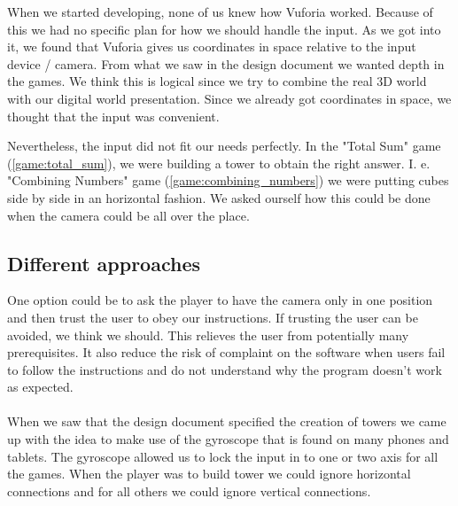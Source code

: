 

When we started developing, none of us knew how Vuforia worked. Because of this
we had no specific plan for how we should handle the input. As we got into it,
we found that Vuforia gives us coordinates in space relative to the input
device / camera. From what we saw in the design document we wanted depth in the
games. We think this is logical since we try to combine the real 3D world with
our digital world presentation. Since we already got coordinates in space, we
thought that the input was convenient.

Nevertheless, the input did not fit our needs perfectly. In the "Total Sum"
game (\ref{game:total_sum}), we were building a tower to obtain the right
answer. I. e. "Combining Numbers" game (\ref{game:combining_numbers}) we were
putting cubes side by side in an horizontal fashion. We asked ourself how this
could be done when the camera could be all over the place.


\subsection{Different approaches}
One option could be to ask the player to have the camera only in one position
and then trust the user to obey our instructions. If trusting the user can be
avoided, we think we should. This relieves the user from potentially many
prerequisites. It also reduce the risk of complaint on the software when users
fail to follow the instructions and do not understand why the program doesn't
work as expected.

\paragraph{}

When we saw that the design document specified the creation of towers we came up with the idea to make use of the gyroscope that is found on many phones and tablets. The gyroscope allowed us to lock the input in to one or two axis for all the games. When the player was to build tower we could ignore horizontal connections and for all others we could ignore vertical connections. 

